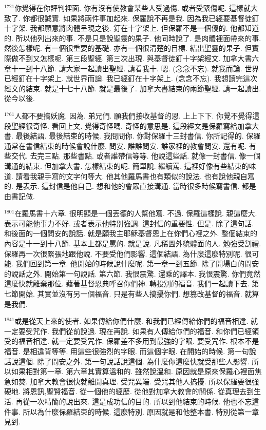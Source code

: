 \documentclass{book}
\begin{document}
$^{1721}$你覺得在你評判裡面.
你有沒有使教會某些人受過傷.
或者受緊傷呢.
這樣就大致了.
你都很誠實.
如果將兩件事加起來.
保羅說不再是我.
因為我已經要基督徒釘十字架.
我都願意將肉體呈現之後.
釘在十字架上.
但保羅不是一個傻的.
他都知道的.
所以他列出來的事.
不是只是說聖靈的果子.
他同時說了.
是肉體裡面帶來的事.
然後怎樣呢.
有一個很重要的基礎.
亦有一個很清楚的目標.
結出聖靈的果子.
但實際做不到又怎樣呢.
第三段聖經.
第三次出現.
與基督徒釘十字架經文.
加拿大書六章十一到十八節.
請大家一起讀出聖經.
請看我十.
嗯.
(念念不忘).
就我而論.
世界已經釘在十字架上.
就世界而論.
我已經釘在十字架上.
(念念不忘).
我想讀完這次經文的結束.
就是十七十八節.
就是最後了.
加拿大書結束的兩節聖經.
請一起讀出.
從今以後.

$^{1761}$人都不要搞妖魔.
因為.
弟兄們.
願我們接收基督的恩.
上上下下.
你覺不覺得這段聖經很奇怪.
看回上文.
覺得奇怪嗎.
奇怪的意思是.
這段經文是保羅寫給加拿大書.
最後結語.
最後結束的時候.
我問問你.
你對保羅十三封書信.
你所記得的.
保羅通常在書信結束的時候會說什麼.
問安.
誰誰問安.
誰家裡的教會問安.
還有呢.
有些交代.
去完三點.
那些書點.
或者誰帶信等等.
他說這些話.
就像一封書信.
像一個溝通的結束.
但加拿大書.
怎樣結束的呢.
簡單說.
繼續罵.
這裡好像有些結束的味道.
請看我親手寫的文字何等大.
他其他羅馬書也有類似的說法.
也有說他親自寫的.
是表示.
這封信是他自己.
想和他的會眾直接溝通.
當時很多時候寫書信.
都是由書記做.

$^{1801}$在羅馬書十六章.
很明顯是一個丟德的人幫他寫.
不過.
保羅這樣說.
親這麼大.
表示可能他事力不好.
或者表示他特別強調.
這封信的重要性.
但是.
除了這句話.
和後面的一個問安的說話.
就是願我主耶穌基督恩上在你們心裡之外.
整個結束的內容是十一到十八節.
基本上都是罵的.
就是說.
凡稀圖外貌體面的人.
勉強受割禮.
保羅再一次很緊張地跟他說.
不要受他們影響.
這個結語.
為什麼這麼特別呢.
很可能.
我們回到第一章.
他開始的時候說什麼呢.
第一章一到五節.
除了開場白的問安的說話之外.
開始第一句說話.
第六節.
我恨震驚.
還乘的譯本.
我恨震驚.
你們竟然這麼快就離棄那位.
藉著基督恩典呼召你們神.
轉投別的福音.
我們一起讀下去.
第七節開始.
其實並沒有另一個福音.
只是有些人搞擾你們.
想篡改基督的福音.
就算是我們.

$^{1841}$或是從天上來的使者.
如果傳給你們什麼.
和我們已經傳給你們的福音相違.
就一定要受咒作.
我們從前說過.
現在再說.
如果有人傳給你們的福音.
和你們已經領受的福音相違.
就一定要受咒作.
保羅差不多用到最強的字眼.
要受咒作.
根本不是福音.
是相違背等等.
用這些很強烈的字眼.
而這個字眼.
在開始的時候.
第一句說話說這個.
除了問安之外.
第一句說話說這個.
為什麼你這麼快就受那些人影響.
所以如果相對第一章.
第六章其實算溫和的.
雖然說溫和.
原因就是原來保羅心裡面焦急如焚.
加拿大教會很快就離開真理.
受咒異端.
受咒其他人搞擾.
所以保羅要很強硬地.
將恩訊,聖賢福音.
從一個他的經歷.
從他對加拿大教會的關係.
從真理去到生活.
再從一次精簡的說出來.
這是成功信的目的.
所以到他結束的時候.
他也不忘這件事.
所以為什麼保羅結束的時候.
這麼特別.
原因就是和他整本書.
特別從第一章見到.
\end{document}
